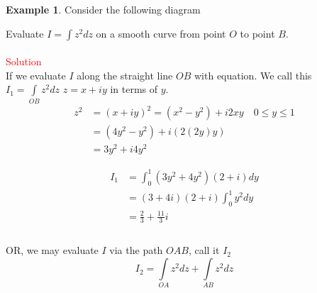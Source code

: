 \documentclass[11pt,a4paper]{article}
\theoremstyle{definition}
\newtheorem{example}[thm]{Example}
\begin{document}
\begin{example}
Consider the following diagram


\begin{figure}[H]
\centering
{}
\end{figure}
















Evaluate $\displaystyle{I = \int z^2 dz}$ on a smooth curve from point $O$ to point $B$.\\\\





\textcolor{red}{Solution}\\
If we evaluate $I$ along the straight line $OB$ with equation. We call this $\displaystyle{I_1 = \int\limits_{OB}z^2dz}$ $z = x + iy$ in terms of $y$. 
\begin{align*}
 z^2 & = (x + iy )^2  = (x^2 - y^2) + i 2xy\quad  0\leq y\leq 1\\
 & = (4y^2 - y^2) + i (2(2y)y)\\
 & = 3y^2 + i4y^2
\end{align*}



\begin{align*}
I_1 & = \int^1_0(3y^2 + 4y^2)(2+ i)dy\\
& = (3 + 4i)(2 + i) \int^1_0 y^2 dy\\
& = \frac{2}{3} + \frac{11}{3}i\\\\
\end{align*}







OR, we may evaluate $I$ via the path $OAB$, call it $I_2$
$$I_2 = \int\limits_{OA}z^2dz + \int\limits_{AB}z^2dz$$


\end{example}
\end{document}
